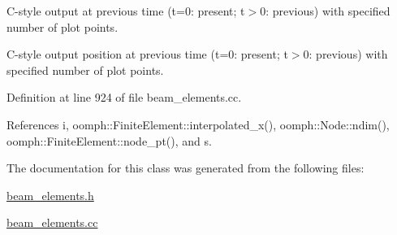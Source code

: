 C-\/style output at previous time (t=0\+: present; t$>$0\+: previous) with specified number of plot points. 

C-\/style output position at previous time (t=0\+: present; t$>$0\+: previous) with specified number of plot points. 

Definition at line 924 of file beam\+\_\+elements.\+cc.



References i, oomph\+::\+Finite\+Element\+::interpolated\+\_\+x(), oomph\+::\+Node\+::ndim(), oomph\+::\+Finite\+Element\+::node\+\_\+pt(), and s.



The documentation for this class was generated from the following files\+:\begin{DoxyCompactItemize}
\item 
\hyperlink{beam__elements_8h}{beam\+\_\+elements.\+h}\item 
\hyperlink{beam__elements_8cc}{beam\+\_\+elements.\+cc}\end{DoxyCompactItemize}
